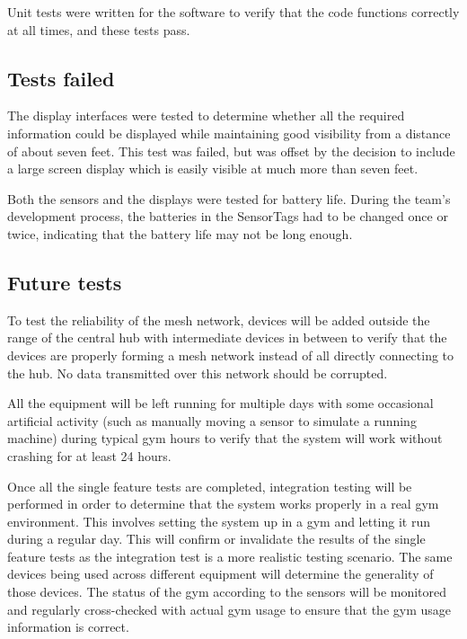 \documentclass[PPFS.tex]{template/subfiles}
\begin{document}
Unit tests were written for the software to verify that the code functions correctly at all times, and these tests pass.

\subsection{Tests failed}

The display interfaces were tested to determine whether all the required information could be displayed while maintaining good visibility from a distance of about seven feet. This test was failed, but was offset by the decision to include a large screen display which is easily visible at much more than seven feet.

Both the sensors and the displays were tested for battery life. During the team's development process, the batteries in the SensorTags had to be changed once or twice, indicating that the battery life may not be long enough.

\subsection{Future tests}

To test the reliability of the mesh network, devices will be added outside the range of the central hub with intermediate devices in between to verify that the devices are properly forming a mesh network instead of all directly connecting to the hub. No data transmitted over this network should be corrupted.

All the equipment will be left running for multiple days with some occasional artificial activity (such as manually moving a sensor to simulate a running machine) during typical gym hours to verify that the system will work without crashing for at least 24 hours.

Once all the single feature tests are completed, integration testing will be performed in order to determine that the system works properly in a real gym environment. This involves setting the system up in a gym and letting it run during a regular day. This will confirm or invalidate the results of the single feature tests as the integration test is a more realistic testing scenario. The same devices being used across different equipment will determine the generality of those devices. The status of the gym according to the sensors will be monitored and regularly cross-checked with actual gym usage to ensure that the gym usage information is correct.
\end{document}
